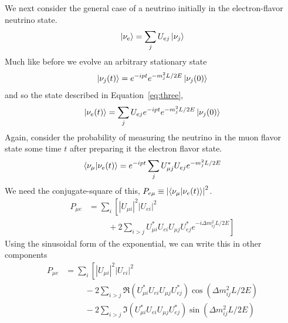 \documentclass[main.tex]{subfiles}
\begin{document}
We next consider the general case of a neutrino initially in the electron-flavor neutrino state. 
\begin{equation}\label{eq:three}
    \left| \nu_{e} \right > =\sum\limits_{j} U_{ej} \left| \nu_{j} \right > 
\end{equation}
Much like before we evolve an arbitrary stationary state
\begin{equation}
    \left| \nu_{j} (t) \right >  = e^{-ipt}e^{ -m_{j}^{2}L/2E}\left| \nu_{j} (0) \right >
\end{equation}
and so the state described in Equation~\eqref{eq:three},
\begin{equation}
    \left| \nu_{e}(t) \right > = \sum\limits_{j} U_{ej} e^{-ipt}e^{ -m_{j}^{2}L/2E}\left| \nu_{j} (0) \right >
\end{equation}
Again, consider the probability of measuring the neutrino in the muon flavor state some time $t$ after preparing it the electron flavor state. 
\begin{equation}
    \left< \nu_{\mu} | \nu_{e}(t) \right> = e^{-ipt} \sum\limits_{j} U_{\mu j}^{*}U_{ej} e^{ -m_{j}^{2}L/2E}
\end{equation}
We need the conjugate-square of this, $P_{e\mu} \equiv \left|\left< \nu_{\mu}|\nu_{e}(t) \right>\right|^{2}$.
\begin{equation}\begin{split}
P_{\mu e}&= \sum\limits_{i}\left[\left|U_{\mu i}\right|^{2}\left|U_{e i}\right|^{2} \right.\\
&\hspace{1cm} + 2\sum\limits_{i>j}U_{\mu i}^{*}U_{e i}U_{\mu j}U_{e j}^{*}\left.e^{-i\Delta m_{ij}^{2}L/2E} \right]
\end{split}\end{equation} 
Using the sinusoidal form of the exponential, we can write this in other components 
\begin{equation}\begin{split}
    P_{\mu e}&= \sum\limits_{i}\left[\left|U_{\mu i}\right|^{2}\left|U_{e i}\right|^{2} \right.\\
    &\hspace{1cm} -2\sum\limits_{i>j} \Re(U_{\mu i}^{*}U_{e i}U_{\mu j}U_{e j}^{*})\cos\left(\Delta m_{ij}^{2}L/2E \right) \\
    &\hspace{1cm} -2\sum\limits_{i>j}\Im(U_{\mu i}^{*}U_{e i}U_{\mu j}U_{e j}^{*})\sin\left(\Delta m_{ij}^{2}L/2E \right)
\end{split}\end{equation} 
\end{document}
